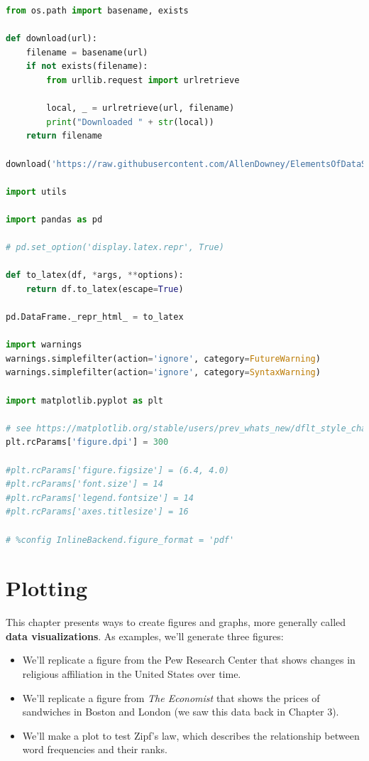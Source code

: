 \documentclass[
]{book}
\author{}
\date{}
\begin{document}
\frontmatter

\mainmatter
\begin{lstlisting}[language=Python]
from os.path import basename, exists

def download(url):
    filename = basename(url)
    if not exists(filename):
        from urllib.request import urlretrieve

        local, _ = urlretrieve(url, filename)
        print("Downloaded " + str(local))
    return filename

download('https://raw.githubusercontent.com/AllenDowney/ElementsOfDataScience/v1/utils.py')

import utils

import pandas as pd

# pd.set_option('display.latex.repr', True)

def to_latex(df, *args, **options):
    return df.to_latex(escape=True)

pd.DataFrame._repr_html_ = to_latex

import warnings
warnings.simplefilter(action='ignore', category=FutureWarning)
warnings.simplefilter(action='ignore', category=SyntaxWarning)

import matplotlib.pyplot as plt

# see https://matplotlib.org/stable/users/prev_whats_new/dflt_style_changes.html#figure-size-font-size-and-screen-dpi
plt.rcParams['figure.dpi'] = 300

#plt.rcParams['figure.figsize'] = (6.4, 4.0)
#plt.rcParams['font.size'] = 14
#plt.rcParams['legend.fontsize'] = 14
#plt.rcParams['axes.titlesize'] = 16

# %config InlineBackend.figure_format = 'pdf'
\end{lstlisting}

\chapter{Plotting}\label{plotting}

This chapter presents ways to create figures and graphs, more generally
called \textbf{data visualizations}. As examples, we'll generate three
figures:

\begin{itemize}
\item
  We'll replicate a figure from the Pew Research Center that shows
  changes in religious affiliation in the United States over time.
\item
  We'll replicate a figure from \emph{The Economist} that shows the
  prices of sandwiches in Boston and London (we saw this data back in
  Chapter 3).
\item
  We'll make a plot to test Zipf's law, which describes the relationship
  between word frequencies and their ranks.
\end{itemize}
\end{document}
